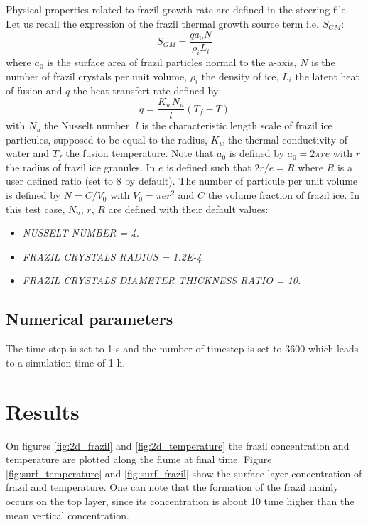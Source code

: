Physical properties related to frazil growth rate are defined in the \khione steering file. Let us recall
the expression of the frazil thermal growth source term i.e. $S_{GM}$:
\begin{equation}
S_{GM} = \dfrac{q a_0 N}{\rho_i L_i}
\end{equation}
where $a_0$ is the surface area of frazil particles normal to the a-axis, $N$ is the number of frazil crystals
per unit volume, $\rho_i$ the density of ice, $L_i$ the latent heat of fusion and $q$ the heat transfert rate
defined by:
\begin{equation}
q = \dfrac{K_w N_u}{l} (T_f-T)
\end{equation}
with $N_u$ the Nusselt number, $l$ is the characteristic length scale of frazil ice particules, supposed to be equal to the radius, $K_w$ the thermal conductivity of water and $T_f$ the fusion temperature. Note that $a_0$ is defined by $a_0 = 2 \pi r e$ with $r$ the radius of frazil ice granules. In \khione $e$ is defined such that $2 r/e = R$ where $R$ is a user defined ratio (set to $8$ by default). The number of particule per unit volume is defined by $N=C/V_0$ with $V_0=\pi e r^2$ and $C$ the volume fraction of frazil ice.
In this test case, $N_u$, $r$, $R$ are defined with their default values:
\begin{itemize}
	\item\textit{NUSSELT NUMBER = 4.}
	\item\textit{FRAZIL CRYSTALS RADIUS = 1.2E-4}
	\item\textit{FRAZIL CRYSTALS DIAMETER THICKNESS RATIO  = 10.}
\end{itemize}

\subsection{Numerical parameters}
The time step is set to 1 s and the number of timestep is set to $3600$ which leads to a simulation time of 1 h.

\section{Results}

On figures \ref{fig:2d_frazil} and \ref{fig:2d_temperature} the frazil concentration and temperature are plotted along the flume at final time. Figure \ref{fig:surf_temperature} and \ref{fig:surf_frazil} show the surface layer concentration of frazil and temperature. One can note that the formation of the frazil mainly occurs on the top layer, since its concentration is about 10 time higher than the mean vertical concentration.

